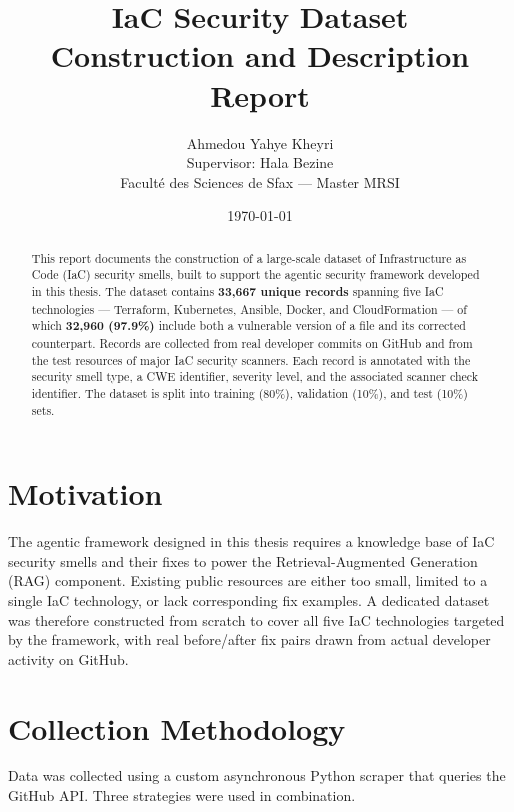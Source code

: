 \documentclass[11pt,a4paper]{article}
\title{IaC Security Dataset\\
\large Construction and Description Report}
\author{Ahmedou Yahye Kheyri\\Supervisor: Hala Bezine\\
\small Faculté des Sciences de Sfax --- Master MRSI}
\date{\today}
\begin{document}
\maketitle

\begin{abstract}
This report documents the construction of a large-scale dataset of Infrastructure as Code (IaC) security smells, built to support the agentic security framework developed in this thesis. The dataset contains \textbf{33,667 unique records} spanning five IaC technologies --- Terraform, Kubernetes, Ansible, Docker, and CloudFormation --- of which \textbf{32,960 (97.9\%)} include both a vulnerable version of a file and its corrected counterpart. Records are collected from real developer commits on GitHub and from the test resources of major IaC security scanners. Each record is annotated with the security smell type, a CWE identifier, severity level, and the associated scanner check identifier. The dataset is split into training (80\%), validation (10\%), and test (10\%) sets.
\end{abstract}

\tableofcontents
\newpage

\section{Motivation}

The agentic framework designed in this thesis requires a knowledge base of IaC security smells and their fixes to power the Retrieval-Augmented Generation (RAG) component. Existing public resources are either too small, limited to a single IaC technology, or lack corresponding fix examples. A dedicated dataset was therefore constructed from scratch to cover all five IaC technologies targeted by the framework, with real before/after fix pairs drawn from actual developer activity on GitHub.

\section{Collection Methodology}

Data was collected using a custom asynchronous Python scraper that queries the GitHub API. Three strategies were used in combination.
\end{document}
